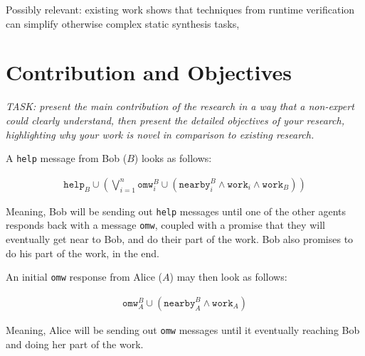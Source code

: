 \documentclass[conference]{IEEEtran}
\begin{document}
Possibly relevant: existing work shows that techniques from runtime
verification can simplify otherwise complex static synthesis
tasks\cite{2022-Runtime-Verification-Meets-Controller-Synthesis},


\section{Contribution and Objectives}

\emph{TASK: present the main contribution of the research in a way
that a non-expert could clearly understand, then present the detailed
objectives of your research, highlighting why your work is novel in
comparison to existing research.}



A \texttt{help} message from Bob ($B$) looks as follows:

\begin{align}
\mathtt{help}_B \cup %
  \left( \bigvee_{i=1}^n %
    \mathtt{omw}_i^B \cup %
    \left(\mathtt{nearby}_i^B \wedge \mathtt{work}_i \wedge \mathtt{work}_B \right) %
  \right) %
\end{align}

Meaning, Bob will be sending out \texttt{help} messages until one of
the other agents responds back with a message \texttt{omw}, coupled
with a promise that they will eventually get near to Bob, and do their
part of the work. Bob also promises to do his part of the work, in the
end.

An initial \texttt{omw} response from Alice ($A$) may then look as
follows:

\begin{align}
\mathtt{omw}^B_A \cup %
  \left( \mathtt{nearby}_A^B \wedge \mathtt{work}_A \right)%
\end{align}

Meaning, Alice will be sending out \texttt{omw} messages until it
eventually reaching Bob and doing her part of the work.


\end{document}
